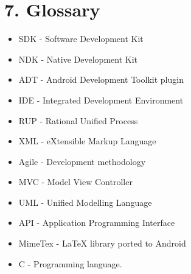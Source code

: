 \documentclass[29pt,a4paper]{moderncv}
\begin{document}
	\section*{\textbf{7. Glossary}}
	\vspace{4mm}
		\begin{itemize}
			\item SDK - Software Development Kit
			\item NDK - Native Development Kit
			\item ADT - Android Development Toolkit plugin
			\item IDE - Integrated Development Environment
			\item RUP - Rational Unified Process
			\item XML - eXtensible Markup Language
			\item Agile - Development methodology
			\item MVC - Model View Controller
			\item UML - Unified Modelling Language
			\item API - Application Programming Interface
			\item MimeTex - LaTeX library ported to Android
			\item C - Programming language.
			
		\end{itemize}
	\vspace{5mm}
\end{document}
